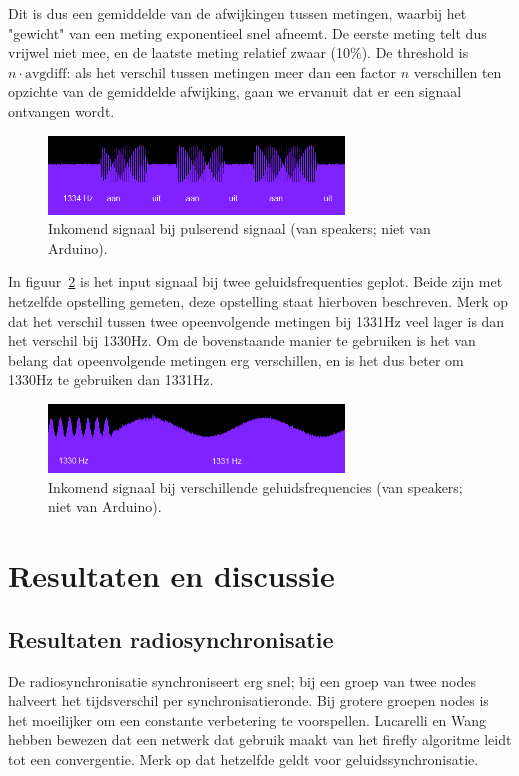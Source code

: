 \documentclass[a4paper,10pt]{article}
\begin{document}
Dit is dus een gemiddelde van de afwijkingen tussen metingen, waarbij het "gewicht" van een meting exponentieel snel afneemt. De eerste meting telt dus vrijwel niet mee, en de laatste meting relatief zwaar (10\%). De threshold is $n\cdot\text{avgdiff}$: als het verschil tussen metingen meer dan een factor $n$ verschillen ten opzichte van de gemiddelde afwijking, gaan we ervanuit dat er een signaal ontvangen wordt.
\begin{figure}[ht!]
    \centering
    \includegraphics[width=0.7\textwidth]{resonance_on_off_commit_ff82f.png}
    \caption{Inkomend signaal bij pulserend signaal (van speakers; niet van Arduino).}
    \label{fig:on_off}
\end{figure}
\FloatBarrier

In figuur~\ref{fig:resonance} is het input signaal bij twee geluidsfrequenties geplot. Beide zijn met hetzelfde opstelling gemeten, deze opstelling staat hierboven beschreven. Merk op dat het verschil tussen twee opeenvolgende metingen bij 1331Hz veel lager is dan het verschil bij 1330Hz. Om de bovenstaande manier te gebruiken is het van belang dat opeenvolgende metingen erg verschillen, en is het dus beter om 1330Hz te gebruiken dan 1331Hz.
\begin{figure}[ht!]
    \centering
    \includegraphics[width=0.7\textwidth]{resonance_2_frequencies_commit_ff82f.png}
    \caption{Inkomend signaal bij verschillende geluidsfrequencies (van speakers; niet van Arduino).}
    \label{fig:resonance}
\end{figure}
\FloatBarrier

\section{Resultaten en discussie}\label{sec:resultaten}
\subsection{Resultaten radiosynchronisatie}
De radiosynchronisatie synchroniseert erg snel; bij een groep van twee nodes halveert het tijdsverschil per synchronisatieronde. Bij grotere groepen nodes is het moeilijker om een constante verbetering te voorspellen. Lucarelli en Wang\cite{lucarelli2004decentralized} hebben bewezen dat een netwerk dat gebruik maakt van het firefly algoritme leidt tot een convergentie. Merk op dat hetzelfde geldt voor geluidssynchronisatie.
\end{document}
